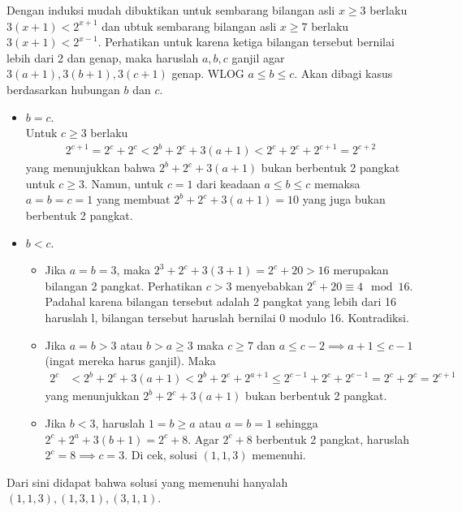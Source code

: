 
\begin{solusi}
    Dengan induksi mudah dibuktikan untuk sembarang bilangan asli $x \ge 3$  berlaku $3(x+1) < 2^{x+1}$ dan ubtuk sembarang bilangan asli $x \ge 7$ berlaku $3(x+1) < 2^{x-1}$. Perhatikan untuk karena ketiga bilangan tersebut bernilai lebih dari 2 dan genap, maka haruslah $a,b,c$ ganjil agar $3(a+1),3(b+1),3(c+1)$ genap.
    WLOG $a \le b \le c$. Akan dibagi kasus berdasarkan hubungan $b$ dan $c$.

    \begin{itemize}
        \item $b = c$.\\
        Untuk $c \ge 3$ berlaku
        \begin{align*}
            2^{c+1} = 2^c + 2^c < 2^b + 2^c + 3(a+1) < 2^c + 2^c +2^{c+1} = 2^{c+2}
        \end{align*}
        yang menunjukkan bahwa $2^b + 2^c + 3(a+1)$ bukan berbentuk 2 pangkat untuk $c \ge 3$. Namun, untuk $c=1$ dari keadaan $a \le b \le c$ memaksa $a=b=c=1$ yang membuat $2^b+2^c+3(a+1)=10$ yang juga bukan berbentuk 2 pangkat.

        \item $b < c$.\\
        \begin{itemize}
            \item Jika $a=b=3$, maka $2^3+2^c+3(3+1)=2^c+20>16$ merupakan bilangan 2 pangkat. Perhatikan $c>3$ menyebabkan $2^c+20 \equiv 4 \mod 16$. Padahal karena bilangan tersebut adalah 2 pangkat yang lebih dari 16 haruslah l, bilangan tersebut haruslah bernilai 0 modulo 16. Kontradiksi.

            \item Jika $a=b > 3$ atau $b > a \ge 3$ maka $c \ge 7$ dan $a \le c-2 \implies a+1 \le c-1$ (ingat mereka harus ganjil). Maka
            \begin{align*}
                2^{c} &< 2^b + 2^c + 3(a+1)
                < 2^b + 2^c + 2^{a+1} \le 2^{c-1} + 2^c + 2^{c-1} = 2^c + 2^{c} = 2^{c+1}
            \end{align*}
            yang menunjukkan $2^b + 2^c + 3(a+1)$ bukan berbentuk 2 pangkat.
        
            \item Jika $b <3$, haruslah $1 = b \ge a$ atau $a=b=1$ sehingga $2^c+2^a+3(b+1)=2^c+8$. Agar $2^c+8$ berbentuk 2 pangkat, haruslah $2^c=8 \implies c=3$. Di cek, solusi $(1,1,3)$ memenuhi.
        \end{itemize}
    \end{itemize}
    Dari sini didapat bahwa solusi yang memenuhi hanyalah $(1,1,3), (1,3,1), (3,1,1)$.
\end{solusi}
